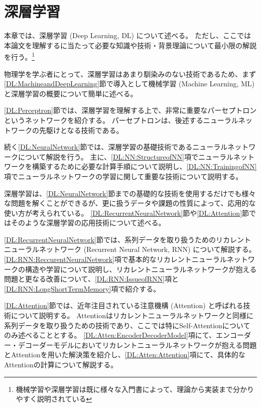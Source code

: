 
\chapter{深層学習} \label{chap:DeepLearning}

本章では、深層学習 (Deep Learning, DL) について述べる。
ただし、ここでは本論文を理解するに当たって必要な知識や技術・背景理論について最小限の解説を行う。\footnote{機械学習や深層学習は既に様々な入門書\cite{ZeroDeepLearning1, ZeroDeepLearning2, PythonMLPrograming}によって、理論から実装まで分かりやすく説明されている}

物理学を学ぶ者にとって、深層学習はあまり馴染みのない技術であるため、まず\ref{DL:MachineandDeepLearning}節で導入として機械学習 (Machine Learning, ML) と深層学習の概要について簡単に述べる。

\ref{DL:Perceptron}節では、深層学習を理解する上で、非常に重要なパーセプトロンというネットワークを紹介する。
パーセプトロンは、後述するニューラルネットワークの先駆けとなる技術である。

続く\ref{DL:NeuralNetwork}節では、深層学習の基礎技術であるニューラルネットワークについて解説を行う。
主に、\ref{DL:NN:StructureofNN}項でニューラルネットワークを構築するために必要な計算手順について説明し、\ref{DL:NN:TrainingofNN}項でニューラルネットワークの学習に関して重要な技術について説明する。

深層学習は、\ref{DL:NeuralNetwork}節までの基礎的な技術を使用するだけでも様々な問題を解くことができるが、更に扱うデータや課題の性質によって、応用的な使い方が考えられている。
\ref{DL:RecurrentNeuralNetwork}節や\ref{DL:Attention}節ではそのような深層学習の応用技術について述べる。

\ref{DL:RecurrentNeuralNetwork}節では、系列データを取り扱うためのリカレントニューラルネットワーク (Recurrent Neural Network, RNN) について解説する。
\ref{DL:RNN:ReccurentNeuralNetwork}項で基本的なリカレントニューラルネットワークの構造や学習について説明し、リカレントニューラルネットワークが抱える問題と更なる改善について、\ref{DL:RNN:IssueofRNN}項と\ref{DL:RNN:LongShortTermMemory}項で紹介する。

\ref{DL:Attention}節では、近年注目されている注意機構 (Attention) と呼ばれる技術について説明する。
Attentionはリカレントニューラルネットワークと同様に系列データを取り扱うための技術であり、ここでは特にSelf-Attentionについてのみ述べることとする。
\ref{DL:Atten:EncoderDecoderModel}項にて、エンコーダー・デコーダーモデルにおいてリカレントニューラルネットワークが抱える問題とAttentionを用いた解決策を紹介し、\ref{DL:Atten:Attention}項にて、具体的なAttentionの計算について解説する。

